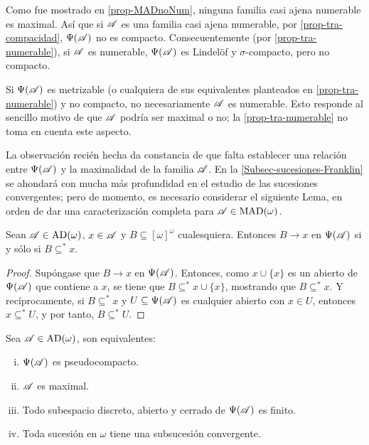 Como fue mostrado en \ref{prop-MADnoNum}, ninguna familia casi ajena numerable es maximal. Así que si $\mathscr{A}$ es una familia casi ajena numerable, por \ref{prop-tra-compacidad}, $\Psi(\mathscr{A})$ no es compacto. Consecuentemente (por \ref{prop-tra-numerable}), si $\mathscr{A}$ es numerable, $\Psi(\mathscr{A})$ es Lindelöf y $\sigma$-compacto, pero no compacto.

\begin{observacion}
	Si $\Psi(\mathscr{A})$ es metrizable (o cualquiera de sus equivalentes planteados en \ref{prop-tra-numerable}) y no compacto, no necesariamente $\mathscr{A}$ es numerable. Esto responde al sencillo motivo de que $\mathscr{A}$ podría ser maximal o no; la \autoref{prop-tra-numerable} no toma en cuenta este aspecto.
\end{observacion}

La observación recién hecha da constancia de que falta establecer una relación entre $\Psi(\mathscr{A})$ y la maximalidad de la familia $\mathscr{A}$. En la \autoref{Subsec-sucesiones-Franklin} se ahondará con mucha más profundidad en el estudio de las sucesiones convergentes; pero de momento, es necesario considerar el siguiente Lema, en orden de dar una caracterización completa para $\mathscr{A} \in \operatorname{MAD}(\omega)$.

\begin{lema}\label{lem-convObvia}
	Sean $\mathscr{A} \in \operatorname{AD}(\omega) $, $x \in \mathscr{A}$ y $B \subseteq [\omega]^\omega$ cualesquiera. Entonces $B \to x$ en $\Psi(\mathscr{A})$ si y sólo si $B \subseteq ^* x$.
\end{lema}

\begin{proof}
	Supóngase que $B \to x$ en $\Psi(\mathscr{A})$. Entonces, como $x \cup \{x\}$ es un abierto de $\Psi(\mathscr{A})$ que contiene a $x$, se tiene que $B \subseteq^* x \cup \{x\}$, mostrando que $B \subseteq^* x$. Y recíprocamente, si $B \subseteq^* x$ y $U \subseteq \Psi(\mathscr{A})$ es cualquier abierto con $x \in U$, entonces $x \subseteq^* U$, y por tanto, $B \subseteq^* U$.
\end{proof}

\begin{proposicion}\label{prop-tra-pseudoCaract}
	Sea $\mathscr{A} \in \operatorname{AD}(\omega)$, son equivalentes:
	\begin{enumerate}[i)]
		\item $\Psi(\mathscr{A})$ es pseudocompacto.
		\item $\mathscr{A}$ es maximal.
		\item Todo subespacio discreto, abierto y cerrado de $\Psi(\mathscr{A})$ es finito.
		\item Toda sucesión en $\omega$ tiene una subsucesión convergente.
	\end{enumerate}
\end{proposicion}

